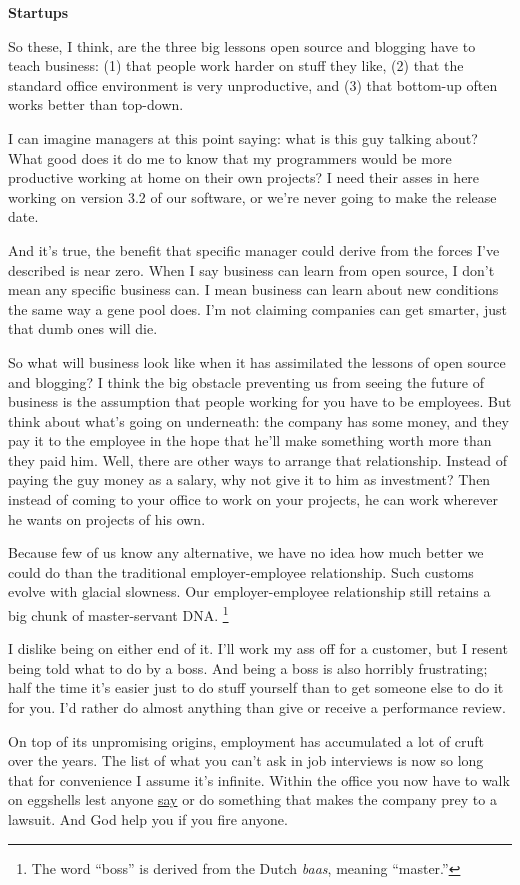 \textbf{Startups}

So these, I think, are the three big lessons open source and blogging
have to teach business: (1) that people work harder on stuff they like,
(2) that the standard office environment is very unproductive, and (3)
that bottom-up often works better than top-down.

I can imagine managers at this point saying: what is this guy talking
about? What good does it do me to know that my programmers would be more
productive working at home on their own projects? I need their asses in
here working on version 3.2 of our software, or we're never going to
make the release date.

And it's true, the benefit that specific manager could derive from the
forces I've described is near zero. When I say business can learn from
open source, I don't mean any specific business can. I mean business can
learn about new conditions the same way a gene pool does. I'm not
claiming companies can get smarter, just that dumb ones will die.

So what will business look like when it has assimilated the lessons of
open source and blogging? I think the big obstacle preventing us from
seeing the future of business is the assumption that people working for
you have to be employees. But think about what's going on underneath:
the company has some money, and they pay it to the employee in the hope
that he'll make something worth more than they paid him. Well, there are
other ways to arrange that relationship. Instead of paying the guy money
as a salary, why not give it to him as investment? Then instead of
coming to your office to work on your projects, he can work wherever he
wants on projects of his own.

Because few of us know any alternative, we have no idea how much better
we could do than the traditional employer-employee relationship. Such
customs evolve with glacial slowness. Our employer-employee relationship
still retains a big chunk of master-servant DNA. \footnote{The word ``boss'' is derived from the Dutch \emph{baas}, meaning
``master.''}

I dislike being on either end of it. I'll work my ass off for a
customer, but I resent being told what to do by a boss. And being a boss
is also horribly frustrating; half the time it's easier just to do stuff
yourself than to get someone else to do it for you. I'd rather do almost
anything than give or receive a performance review.

On top of its unpromising origins, employment has accumulated a lot of
cruft over the years. The list of what you can't ask in job interviews
is now so long that for convenience I assume it's infinite. Within the
office you now have to walk on eggshells lest anyone
\href{say.html}{say} or do something that makes the company prey to a
lawsuit. And God help you if you fire anyone.

